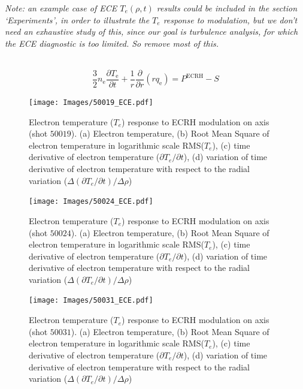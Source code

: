 \documentclass[preprint,12pt,authoryear]{elsarticle}
\begin{document}
{\em Note: an example case of ECE $T_e(\rho,t)$ results could be included in the section `Experiments', in order to illustrate the $T_e$ response to modulation, but we don't need an exhaustive study of this, since our goal is turbulence analysis, for which the ECE diagnostic is too limited. So remove most of this.}

~\protect\cite{S_Eguilior_2003}
\begin{equation}
    \frac{3}{2}n_\mathrm{e}\frac{\partial T_\mathrm{e}}{\partial t} + \frac{1}{r}\frac{\partial }{\partial r}(r q_\mathrm{e}) = P^\mathrm{ECRH} - S
    \label{Eq.Transport_1}
\end{equation}

\begin{figure}[!ht]
   \texttt{[image: Images/50019\_ECE.pdf]}
   \caption{Electron temperature ($T_e$) response to ECRH modulation on axis (shot $50019$). (a) Electron temperature, (b) Root Mean Square of electron temperature in logarithmic scale RMS($T_e$), (c) time derivative of electron temperature ($\partial T_e /\partial t $), (d) variation of time derivative of electron temperature with respect to the radial variation ($\Delta(\partial T_e /\partial t)/\Delta \rho $)}
   \label{Fig:50019_ECE}
\end{figure}

\begin{figure}[!ht]

   \texttt{[image: Images/50024\_ECE.pdf]}
   \caption{Electron temperature ($T_e$) response to ECRH modulation on axis (shot $50024$). (a) Electron temperature, (b) Root Mean Square of electron temperature in logarithmic scale RMS($T_e$), (c) time derivative of electron temperature ($\partial T_e /\partial t $), (d) variation of time derivative of electron temperature with respect to the radial variation ($\Delta(\partial T_e /\partial t)/\Delta \rho $)}
   \label{Fig:50024_ECE}
\end{figure}

\begin{figure}[!ht]
   \texttt{[image: Images/50031\_ECE.pdf]}
   \caption{Electron temperature ($T_e$) response to ECRH modulation on axis (shot $50031$). (a) Electron temperature, (b) Root Mean Square of electron temperature in logarithmic scale RMS($T_e$), (c) time derivative of electron temperature ($\partial T_e /\partial t $), (d) variation of time derivative of electron temperature with respect to the radial variation ($\Delta(\partial T_e /\partial t)/\Delta \rho $)}
   \label{Fig:50031_ECE}
\end{figure}
\end{document}

